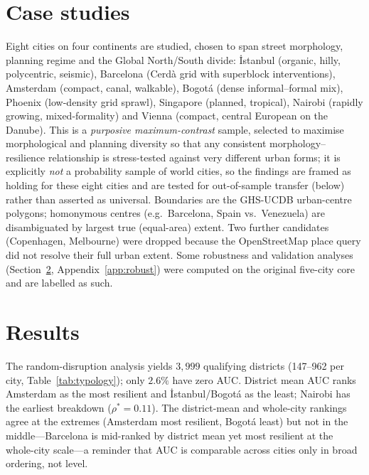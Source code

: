\documentclass[sn-mathphys-num,pdflatex]{sn-jnl}
\newcommand{\rhostar}{\rho^{*}}
\begin{document}
\section{Case studies}
Eight cities on four continents are studied, chosen to span street morphology, planning
regime and the Global North/South divide: İstanbul (organic, hilly, polycentric,
seismic), Barcelona (Cerdà grid with superblock interventions), Amsterdam (compact,
canal, walkable), Bogotá (dense informal--formal mix), Phoenix (low-density grid
sprawl), Singapore (planned, tropical), Nairobi (rapidly growing, mixed-formality)
and Vienna (compact, central European on the Danube). This is a \emph{purposive
maximum-contrast} sample, selected to maximise morphological and planning diversity so
that any consistent morphology--resilience relationship is stress-tested against very
different urban forms; it is explicitly \emph{not} a probability sample of world
cities, so the findings are framed as holding for these eight cities and are tested for
out-of-sample transfer (below) rather than asserted as universal. Boundaries are the GHS-UCDB
urban-centre polygons; homonymous centres (e.g.\ Barcelona, Spain vs.\ Venezuela)
are disambiguated by largest true (equal-area) extent. Two further candidates
(Copenhagen, Melbourne) were dropped because the OpenStreetMap place query did not
resolve their full urban extent. Some robustness and validation analyses
(Section~\ref{sec:results}, Appendix~\ref{app:robust}) were computed on the original
five-city core and are labelled as such.

\section{Results}\label{sec:results}
The random-disruption analysis yields $3{,}999$ qualifying districts (147--962 per
city, Table~\ref{tab:typology}); only $2.6\%$ have zero AUC. District mean AUC ranks
Amsterdam as the most resilient and İstanbul/Bogotá as the least; Nairobi has the
earliest breakdown ($\rhostar=0.11$). The district-mean and whole-city rankings
agree at the extremes (Amsterdam most resilient, Bogotá least) but not in the
middle---Barcelona is mid-ranked by district mean yet most resilient at the
whole-city scale---a reminder that AUC is comparable across cities only in broad
ordering, not level.
\end{document}
